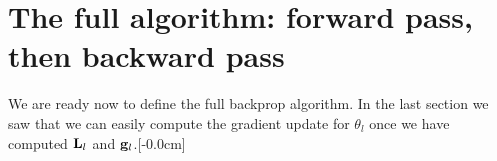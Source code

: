 






\section{The full algorithm: forward pass, then backward pass}
We are ready now to define the full backprop algorithm. In the last section we saw that we can easily compute the gradient update for $\theta_l$ once we have computed $\mathbf{L}_l$ and $\mathbf{g}_l$.[-0.0cm]

